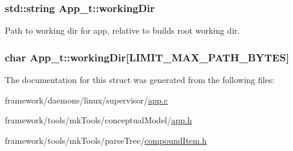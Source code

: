 \subsubsection[{\texorpdfstring{working\+Dir}{workingDir}}]{\setlength{\rightskip}{0pt plus 5cm}std\+::string App\+\_\+t\+::working\+Dir}\hypertarget{struct_app__t_af26217e7b2a8affcbcd7c90e2be5804c}{}\label{struct_app__t_af26217e7b2a8affcbcd7c90e2be5804c}


Path to working dir for app, relative to build\textquotesingle{}s root working dir. 

\subsubsection[{\texorpdfstring{working\+Dir}{workingDir}}]{\setlength{\rightskip}{0pt plus 5cm}char App\+\_\+t\+::working\+Dir\mbox{[}{\bf L\+I\+M\+I\+T\+\_\+\+M\+A\+X\+\_\+\+P\+A\+T\+H\+\_\+\+B\+Y\+T\+ES}\mbox{]}}\hypertarget{struct_app__t_ab73578b0373eaa36fc6454a152bfbab0}{}\label{struct_app__t_ab73578b0373eaa36fc6454a152bfbab0}


The documentation for this struct was generated from the following files\+:\begin{DoxyCompactItemize}
\item 
framework/daemons/linux/supervisor/\hyperlink{supervisor_2app_8c}{app.\+c}\item 
framework/tools/mk\+Tools/conceptual\+Model/\hyperlink{tools_2mk_tools_2conceptual_model_2app_8h}{app.\+h}\item 
framework/tools/mk\+Tools/parse\+Tree/\hyperlink{compound_item_8h}{compound\+Item.\+h}\end{DoxyCompactItemize}
